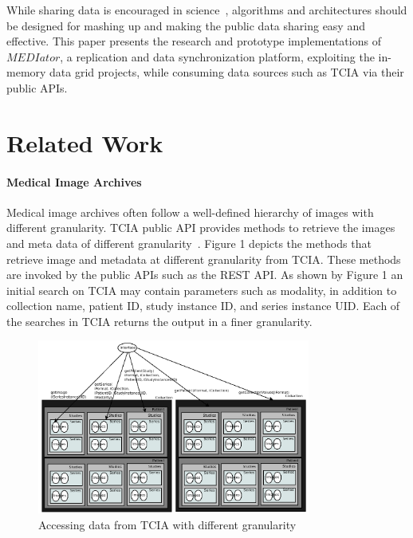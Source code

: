 \documentclass[conference]{IEEEtran}
\begin{document}
While sharing data is encouraged in science~\cite{szala2006science}, algorithms and architectures should be designed for mashing up and making the public data sharing easy and effective. This paper presents the research and prototype implementations of $MEDIator$, a replication and data synchronization platform, exploiting the in-memory data grid projects, while consuming data sources such as TCIA via their public APIs.

%
\section{Related Work}
\paragraph*{\textbf{Medical Image Archives}}

Medical image archives often follow a well-defined hierarchy of images with different granularity. TCIA public API provides methods to retrieve the images and meta data of different granularity~\cite{prior2013tcia}. Figure 1 depicts the methods that retrieve image and metadata at different granularity from TCIA. These methods are invoked by the public APIs such as the REST API. As shown by Figure 1 an initial search on TCIA may contain parameters such as modality, in addition to collection name, patient ID, study instance ID, and series instance UID. Each of the searches in TCIA returns the output in a finer granularity.

\begin{figure}
		\begin{center}
			\includegraphics[width=0.8\textwidth]{methods.png}
	\caption{Accessing data from TCIA with different granularity}
		\end{center}
	\label{fig:methods}
\end{figure}
\end{document}
